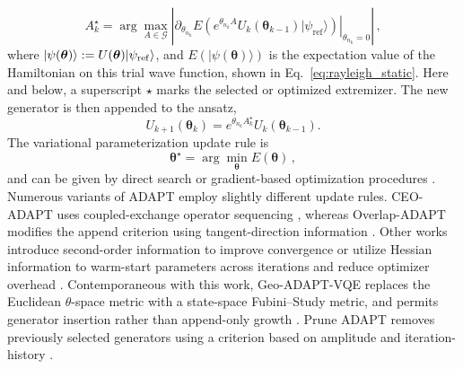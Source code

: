 \documentclass[
  reprint,
  amsmath,
  amssymb,
  aps,
  pra,
  nofootinbib,
  superscriptaddress,
  floatfix
]{revtex4-2}
\newcommand{\ket}[1]{|#1\rangle}
\begin{document}
\begin{equation}
A_k^\star=\arg\max_{A\in\mathcal G}
\left|
\left.
\partial_{\theta_{n_k}}E\!\left(e^{\theta_{n_k} A}U_k(\boldsymbol{\theta}_{k-1})\ket{\psi_{\mathrm{ref}}}\right)
\right|_{\theta_{n_k}=0}
\right|\,,
\label{eq:adapt_append_gradient}
\end{equation}
where \(\ket{\psi(\boldsymbol{\theta})}:=U(\boldsymbol{\theta})\ket{\psi_{\rm ref}}\), and \(E(\ket{\psi(\boldsymbol{\theta})})\) is the expectation value of the Hamiltonian on this trial wave function, shown in Eq.~\eqref{eq:rayleigh_static}. Here and below, a superscript \(\star\) marks the selected or optimized extremizer. The new generator is then appended to the ansatz,
\begin{equation}
U_{k+1}(\boldsymbol{\theta}_{k})=e^{\theta_{n_k} A_k^\star}U_k(\boldsymbol{\theta}_{k-1}).
\label{eq:adapt_append_update}
\end{equation}
The variational parameterization update rule is
\begin{equation}
\label{eq:theta_opt}
\boldsymbol{\theta}^\star=\arg\min_{\boldsymbol{\theta}}E(\boldsymbol{\theta})\,,
\end{equation}
%
and can be given by direct search or gradient-based optimization procedures \cite{BonetMonroig2023Optimizer,Singh2023Optimizers,Gacon2021QNSPSA}. Numerous variants of ADAPT employ slightly different update rules. CEO-ADAPT uses coupled-exchange operator sequencing \cite{Ramoa2025}, whereas Overlap-ADAPT modifies the append criterion using tangent-direction information \cite{Feniou2023}. Other works introduce second-order information to improve convergence \cite{Grimsley2023ADAPT} or utilize Hessian information to warm-start parameters across iterations and reduce optimizer overhead \cite{Ramoa2025HessianRecycling}.
Contemporaneous with this work, Geo-ADAPT-VQE replaces the Euclidean \(\theta\)-space metric with a state-space Fubini--Study metric, and permits generator insertion rather than append-only growth \cite{Sohail2026GeoADAPT}. Prune ADAPT removes previously selected generators using a criterion based on amplitude and iteration-history \cite{Vaquero2025PrunedADAPT}.
\end{document}
